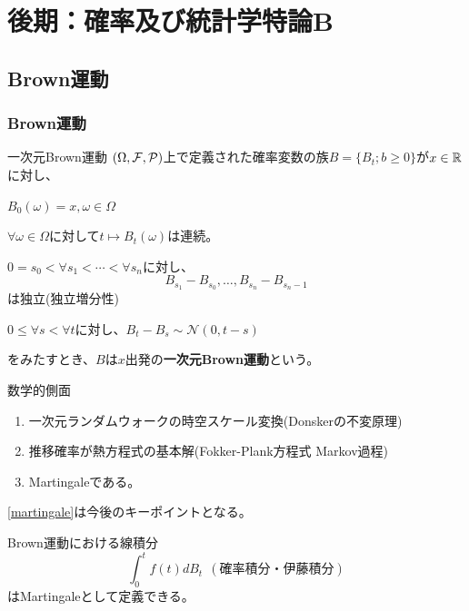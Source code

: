 \documentclass[dvipdfmx, leqno]{jsbook}
\begin{document}
\part{後期：確率及び統計学特論B}
\chapter{Brown運動}
\section{Brown運動}
\begin{soudef}{一次元Brown運動}
    $(\Omega, \mathcal{F}, \mathcal{P})$上で定義された確率変数の族$B= \{B_t; b\ge 0\}$が$x\in \mathbb{R}$に対し、
\begin{enumerate_roman}
    \item $B_0(\omega)= x, \omega\in \Omega$
    \item $\forall \omega\in \Omega$に対して$t\mapsto B_t(\omega)$は連続。
    \item $0= s_0< \forall s_1< \cdots< \forall s_n$に対し、
\begin{equation*}
    B_{s_1}- B_{s_0}, \ldots, B_{s_n}- B_{s_n- 1}
\end{equation*}
    は独立(独立増分性)
    \item $0\le \forall s< \forall t$に対し、$B_t- B_s\sim \mathcal{N}(0, t- s)$
\end{enumerate_roman}
    をみたすとき、$B$は$x$出発の\textbf{一次元Brown運動}という。
\end{soudef}

    数学的側面
\begin{enumerate}
    \item 一次元ランダムウォークの時空スケール変換(Donskerの不変原理)
    \item 推移確率が熱方程式の基本解(Fokker-Plank方程式 Markov過程)
    \item Martingaleである。\label{martingale}
\end{enumerate}
\begin{souremark}
    \ref{martingale}は今後のキーポイントとなる。
\end{souremark}

    Brown運動における線積分
\begin{equation}\label{eq:確率積分・伊藤積分}
    \int_0^t f(t) dB_t\ \ (確率積分・伊藤積分)
\end{equation}
    はMartingaleとして定義できる。
\end{document}
